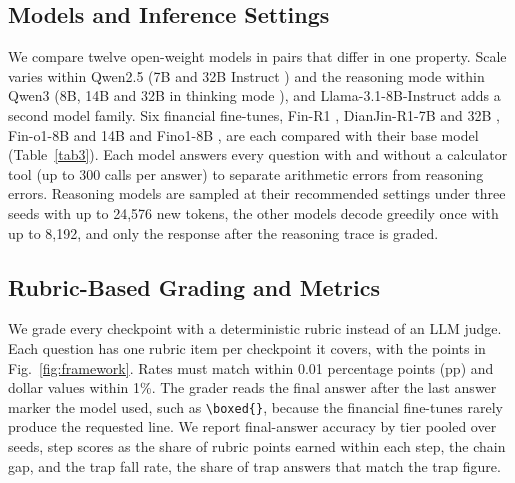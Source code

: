 \documentclass[conference]{IEEEtran}
\begin{document}
\subsection{Models and Inference Settings}\label{sec:models}
We compare twelve open-weight models in pairs that differ in one property. Scale varies within Qwen2.5 (7B and 32B Instruct \cite{b21}) and the reasoning mode within Qwen3 (8B, 14B and 32B in thinking mode \cite{b22}), and Llama-3.1-8B-Instruct \cite{b23} adds a second model family. Six financial fine-tunes, Fin-R1 \cite{b24}, DianJin-R1-7B and 32B \cite{b25}, Fin-o1-8B and 14B and Fino1-8B \cite{b26}, are each compared with their base model (Table~\ref{tab3}). Each model answers every question with and without a calculator tool (up to 300 calls per answer) to separate arithmetic errors from reasoning errors. Reasoning models are sampled at their recommended settings under three seeds with up to 24,576 new tokens, the other models decode greedily once with up to 8,192, and only the response after the reasoning trace is graded.

\subsection{Rubric-Based Grading and Metrics}\label{sec:grading}
We grade every checkpoint with a deterministic rubric instead of an LLM judge. Each question has one rubric item per checkpoint it covers, with the points in Fig.~\ref{fig:framework}. Rates must match within 0.01 percentage points (pp) and dollar values within 1\%. The grader reads the final answer after the last answer marker the model used, such as \verb|\boxed{}|, because the financial fine-tunes rarely produce the requested line. We report final-answer accuracy by tier pooled over seeds, step scores as the share of rubric points earned within each step, the chain gap, and the trap fall rate, the share of trap answers that match the trap figure.
\end{document}
